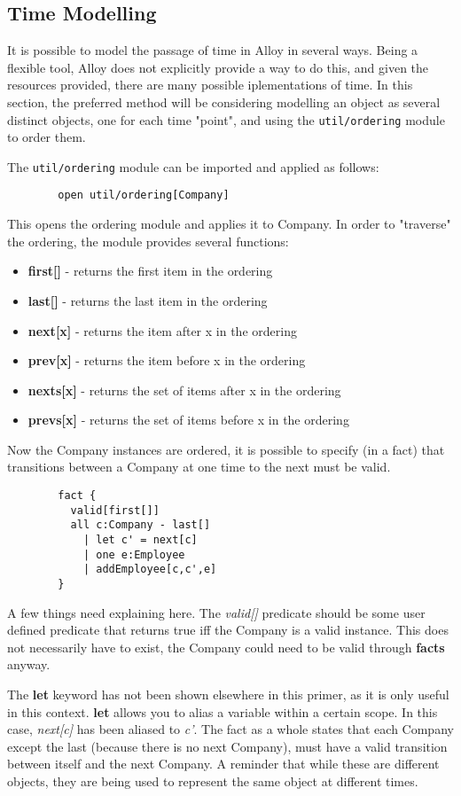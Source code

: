 \documentclass[10pt]{article}
\begin{document}
    \subsection*{Time Modelling}
      It is possible to model the passage of time in Alloy in several ways. Being a flexible tool, Alloy does not explicitly provide a way to do this, and given the resources provided, there are many possible iplementations of time. In this section, the preferred method will be considering modelling an object as several distinct objects, one for each time "point", and using the \lstinline|util/ordering| module to order them.\par
      The \lstinline|util/ordering| module can be imported and applied as follows:
      \begin{lstlisting}
        open util/ordering[Company]
      \end{lstlisting}\par
      This opens the ordering module and applies it to Company. In order to "traverse" the ordering, the module provides several functions:
      \begin{itemize}
        \item\textbf{first[]} - returns the first item in the ordering
        \item\textbf{last[]} - returns the last item in the ordering
        \item\textbf{next[x]} - returns the item after x in the ordering
        \item\textbf{prev[x]} - returns the item before x in the ordering
        \item\textbf{nexts[x]} - returns the set of items after x in the ordering
        \item\textbf{prevs[x]} - returns the set of items before x in the ordering
      \end{itemize}\par
      Now the Company instances are ordered, it is possible to specify (in a fact) that transitions between a Company at one time to the next must be valid.
      \begin{lstlisting}
        fact {
          valid[first[]]
          all c:Company - last[]
            | let c' = next[c]
            | one e:Employee
            | addEmployee[c,c',e]
        }
      \end{lstlisting}\par
      A few things need explaining here. The \textit{valid[]} predicate should be some user defined predicate that returns true iff the Company is a valid instance. This does not necessarily have to exist, the Company could need to be valid through \textbf{facts} anyway.\par
      The \textbf{let} keyword has not been shown elsewhere in this primer, as it is only useful in this context. \textbf{let} allows you to alias a variable within a certain scope. In this case, \textit{next[c]} has been aliased to \textit{c'}. The fact as a whole states that each Company except the last (because there is no next Company), must have a valid transition between itself and the next Company. A reminder that while these are different objects, they are being used to represent the same object at different times.
\end{document}
